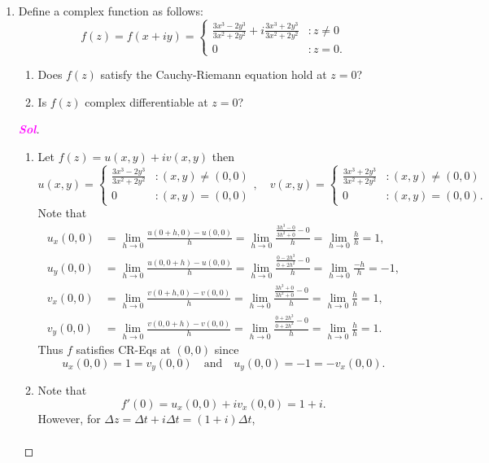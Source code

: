 \documentclass{article}
\theoremstyle{definition}
\newcommand{\of}[1]{\left( #1 \right)}
\newcommand{\sol}{\textcolor{magenta}{\bf Sol}}
\begin{document}
\begin{enumerate}
	\newpage
	\item Define a complex function as follows: \[
	f\of{z}=f\of{x+iy}=\begin{cases}
		\displaystyle\frac{3x^3-2y^3}{3x^2+2y^2}+i\frac{3x^3+2y^3}{3x^2+2y^2} &: z\neq 0\\
		0 &: z=0.
	\end{cases}
	\] \begin{enumerate}
		\item Does $f(z)$ satisfy the Cauchy-Riemann equation hold at $z=0$?
		\item Is $f(z)$ complex differentiable at $z=0$?
	\end{enumerate}
	\begin{proof}[\sol]
		\begin{enumerate}
			\item Let $f\of{z}=u(x,y)+iv(x,y)$ then \[
			u(x,y)=\begin{cases}\displaystyle
				\frac{3x^3-2y^3}{3x^2+2y^2}&: (x,y)\neq (0,0)\\
				0 &: (x,y)=(0,0)
			\end{cases},\quad
			v(x,y)=\begin{cases}\displaystyle
				\frac{3x^3+2y^3}{3x^2+2y^2} &: (x,y)\neq (0,0)\\
				0 &: (x,y)=(0,0).
			\end{cases}
			\] Note that \begin{align*}
				u_x(0,0)&=\lim\limits_{h\to 0}\frac{u(0+h,0)-u(0,0)}{h}=\lim\limits_{h\to 0}\frac{\frac{3h^3-0}{3h^2+0}-0}{h}=\lim\limits_{h\to 0}\frac{h}{h}=1,\\
				u_y(0,0)&=\lim\limits_{h\to 0}\frac{u(0,0+h)-u(0,0)}{h}=\lim\limits_{h\to 0}\frac{\frac{0-2h^3}{0+2h^2}-0}{h}=\lim\limits_{h\to 0}\frac{-h}{h}=-1,\\
				v_x(0,0)&=\lim\limits_{h\to 0}\frac{v(0+h,0)-v(0,0)}{h}=\lim\limits_{h\to 0}\frac{\frac{3h^3+0}{3h^2+0}-0}{h}=\lim\limits_{h\to 0}\frac{h}{h}=1,\\
				v_y(0,0)&=\lim\limits_{h\to 0}\frac{v(0,0+h)-v(0,0)}{h}=\lim\limits_{h\to 0}\frac{\frac{0+2h^3}{0+2h^2}-0}{h}=\lim\limits_{h\to 0}\frac{h}{h}=1.
			\end{align*}
			Thus $f$ satisfies CR-Eqs at $(0,0)$ since \[
			u_x(0,0)=1=v_y(0,0)\quad\text{and}\quad u_y(0,0)=-1=-v_x\of{0,0}.
			\]
			\vspace{4pt}
			\item Note that \[
			f'(0)=u_x(0,0)+iv_x(0,0)=1+i.
			\] However, for $\Delta z=\Delta t+i\Delta t=(1+i)\Delta t$, \begin{align*}

\end{align*}
\end{enumerate}
\end{proof}
\end{enumerate}
\end{document}

